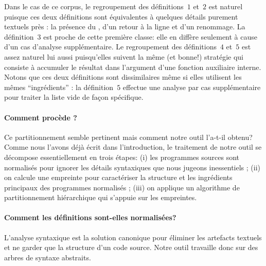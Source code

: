Dans le cas de ce corpus, le regroupement des définitions~$1$ et~$2$
est naturel puisque ces deux définitions sont équivalentes à
quelques détails purement textuels près : la présence du \iocaml{|},
d'un retour à la ligne et d'un renommage. La définition~$3$ est proche
de cette première classe: elle en diffère seulement à cause d'un cas
d'analyse supplémentaire. Le regroupement des définitions~$4$ et~$5$
est assez naturel lui aussi puisqu'elles suivent la même (et bonne!) stratégie
qui consiste à accumuler le résultat dans l'argument d'une fonction
auxiliaire interne. Notons que ces deux définitions sont dissimilaires
même si elles utilisent les mêmes ``ingrédients'' : la définition~$5$
effectue une analyse par cas supplémentaire pour traiter la
liste vide de façon spécifique.


\paragraph{Comment procède {\Asak}?}
Ce partitionnement semble pertinent mais comment
notre outil l'a-t-il obtenu? Comme nous l'avons déjà écrit dans
l'introduction, le traitement de notre outil se décompose
essentiellement en trois étapes: (i) les programmes sources sont
normalisés pour ignorer les détails syntaxiques que nous jugeons
inessentiels ; (ii) on calcule une empreinte pour caractériser la
structure et les ingrédients principaux des programmes normalisés ;
(iii) on applique un algorithme de partitionnement hiérarchique qui
s'appuie sur les empreintes.

\paragraph{Comment les définitions sont-elles normalisées?}
L'analyse syntaxique est la solution canonique pour éliminer les
artefacts textuels et ne garder que la structure d'un code source.
Notre outil travaille donc sur des arbres de syntaxe abstraits. %

